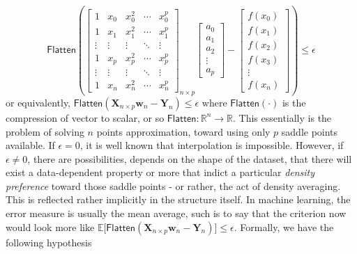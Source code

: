 \documentclass[10pt]{article} %
\begin{document}
\begin{equation}\label{eq:soft_hard_interpolation_role}
\mathsf{Flatten}\left(\begin{bmatrix}
1 & x_0 & x_0^2 & \cdots & x_0^p \\
1 & x_1 & x_1^2 & \cdots & x_1^p \\
\vdots & \vdots & \vdots & \ddots & \vdots \\
1 & x_p & x_p^2 & \cdots & x_p^p \\
\vdots & \vdots & \vdots & \ddots & \vdots \\
1 & x_n & x_n^2 & \cdots & x_n^p
\end{bmatrix}_{n\times p}
\begin{bmatrix}
a_0 \\
a_1 \\
a_2 \\
\vdots \\
a_p
\end{bmatrix}
- 
\begin{bmatrix}
f(x_0) \\
f(x_1) \\
f(x_2) \\
f(x_3) \\
\vdots \\
f(x_n)
\end{bmatrix}\right)
\leq \epsilon
\end{equation}
or equivalently, $\mathsf{Flatten}(\mathbf{X}_{n\times p}\mathbf{w}_{n}-\mathbf{Y}_{n})\leq \epsilon$ where $\mathsf{Flatten}(\cdot)$ is the compression of vector to scalar, or so $\mathsf{Flatten}: \mathbb{R}^{n}\to \mathbb{R}$. This essentially is the problem of solving $n$ points approximation, toward using only $p$ saddle points available. If $\epsilon =0$, it is well known that interpolation is impossible. However, if $\epsilon\ne 0$, there are possibilities, depends on the shape of the dataset, that there will exist a data-dependent property or more that indict a particular \textit{density preference} toward those saddle points - or rather, the act of density averaging. This is reflected rather implicitly in the structure itself. In machine learning, the error measure is usually the mean average, such is to say that the criterion now would look more like $\mathbb{E}\Big[\mathsf{Flatten}(\mathbf{X}_{n\times p}\mathbf{w}_{n}-\mathbf{Y}_{n})\Big]\leq \epsilon$. Formally, we have the following hypothesis
\end{document}
